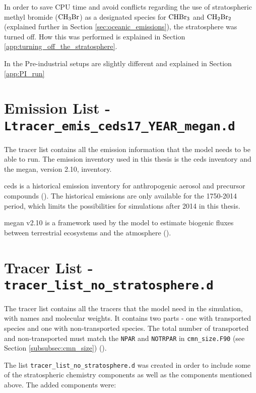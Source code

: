 In order to save CPU time and avoid conflicts regarding the use of stratospheric methyl bromide ($\mathrm{CH_3Br}$) as a designated species for $\mathrm{CHBr_3}$ and $\mathrm{CH_2Br_2}$ (explained further in Section \ref{sec:oceanic_emissions}), the stratosphere was turned off. How this was performed is explained in Section \ref{app:turning_off_the_stratosphere}.

\medskip

In the Pre-industrial setups are slightly different and explained in Section \ref{app:PI_run}

\section{Emission List - \texttt{Ltracer\_emis\_ceds17\_YEAR\_megan.d}}
\label{subsubsec:Ltracer_list}

The tracer list contains all the emission information that the model needs to be able to run. The emission inventory used in this thesis is the \acrlong{ceds} inventory and the \acrlong{megan}, version 2.10, inventory. 

\medskip

\acrshort{ceds} is a historical emission inventory for anthropogenic aerosol and precursor compounds (\cite{Lund2018}). The historical emissions are only available for the 1750-2014 period, which limits the possibilities for simulations after 2014 in this thesis. 

\medskip

\acrshort{megan} v2.10 is a framework used by the model to estimate biogenic fluxes between terrestrial ecosystems and the atmosphere (\cite{Guenther2012}). 



\section{Tracer List - \texttt{tracer\_list\_no\_stratosphere.d}}\label{subsubsec:tracer_list}

The tracer list contains all the tracers that the model need in the simulation, with names and molecular weights. It contains two parts - one with transported species and one with non-transported species. The total number of transported and non-transported must match the \texttt{NPAR} and \texttt{NOTRPAR} in \texttt{cmn\_size.F90} (see Section \ref{subsubsec:cmn_size}) (\cite{SovdeManual}). 

\medskip

The list \texttt{tracer\_list\_no\_stratosphere.d} was created in order to include some of the stratospheric chemistry components as well as the components mentioned above. The added components were: 

